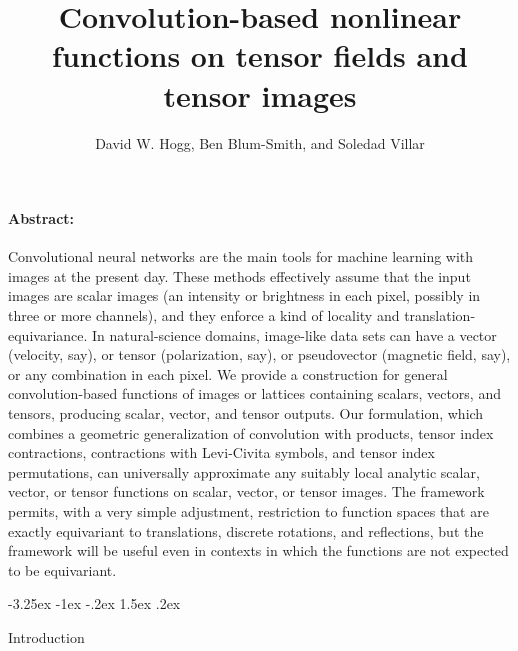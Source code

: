 \documentclass{article}
\title{\bfseries%
Convolution-based nonlinear functions on tensor fields and tensor images}
\author{David W. Hogg, Ben Blum-Smith, and Soledad Villar}
\date{}
\makeatletter
\theoremstyle{plain}
\renewcommand\section{\@startsection {section}{1}{\z@}%
  {-3.25ex \@plus -1ex \@minus -.2ex}%
  {1.5ex \@plus .2ex}%
  {\raggedright\normalfont\large\bfseries}}%
\makeatother
\begin{document}
\maketitle\thispagestyle{empty}

\paragraph{Abstract:}
Convolutional neural networks are the main tools for machine learning with images at the present day.
These methods effectively assume that the input images are scalar images (an intensity or brightness in each pixel, possibly in three or more channels), and they enforce a kind of locality and translation-equivariance.
In natural-science domains, image-like data sets can have a vector (velocity, say), or tensor (polarization, say), or pseudovector (magnetic field, say), or any combination in each pixel.
We provide a construction for general convolution-based functions of images or lattices
containing scalars, vectors, and tensors, producing scalar, vector, and tensor outputs.
Our formulation, which combines a geometric generalization of convolution with products, tensor index contractions, contractions with Levi-Civita symbols, and tensor index permutations, can universally approximate any suitably local analytic scalar, vector, or tensor functions on scalar, vector, or tensor images.
The framework permits, with a very simple adjustment, restriction to function spaces that are exactly equivariant to translations, discrete rotations, and reflections, but the framework will be useful even in contexts in which the functions are not expected to be equivariant.

\section{Introduction}
\end{document}
